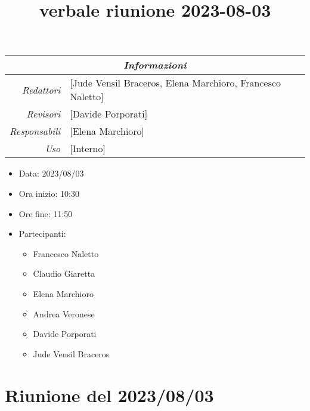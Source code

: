 \documentclass[12pt]{article}
\begin{document}
\graphicspath{ {../../templates/img} }

\title{verbale riunione 2023-08-03}

\firstPage
\maketitle

\begin{center}
\begin{tabular}{r | l}
    \multicolumn{2}{c}{\textit{Informazioni}}\\
    \hline
    
        \textit{Redattori} &
        [Jude Vensil Braceros, Elena Marchioro, Francesco Naletto]\makecell{}\\
    
        \textit{Revisori} &
        [Davide Porporati]\makecell{}\\
        \textit{Responsabili} &
        [Elena Marchioro]\makecell{}\\
            \textit{Uso} & 
            [Interno]\makecell{}\\
\end{tabular}
    \begin{itemize}
    \item[] Data: 2023/08/03
    \item[] Ora inizio: 10:30
    \item[] Ore fine: 11:50
    \item[] Partecipanti:
    \begin{itemize}
    \item[] Francesco Naletto
    \item[] Claudio Giaretta
    \item[] Elena Marchioro
    \item[] Andrea Veronese
    \item[] Davide Porporati
    \item[] Jude Vensil Braceros
    \end{itemize}
\end{itemize}
\end{center}


\tableofcontents
\printindex 
\section{Riunione del 2023/08/03}
\end{document}
